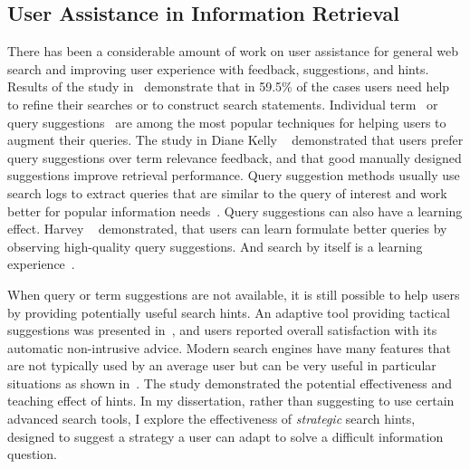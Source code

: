 \subsection{User Assistance in Information Retrieval}
\label{section:relatedwork:conversation:user-assist}

There has been a considerable amount of work on user assistance for general web search and improving user experience with feedback, suggestions, and hints.
Results of the study in~\cite{xie2009understanding} demonstrate that in 59.5\% of the cases users need help to refine their searches or to construct search statements.
Individual term~\cite{ruthven2003survey} or query suggestions~\cite{Bhatia:2011:QSA:2009916.2010023, Cao:2008:CQS:1401890.1401995,Jones:2006:GQS:1135777.1135835} are among the most popular techniques for helping users to augment their queries.
The study in Diane Kelly \etal~\cite{Kelly:2009:CQT:1571941.1572006} demonstrated that users prefer query suggestions over term relevance feedback, and that good manually designed suggestions improve retrieval performance.
Query suggestion methods usually use search logs to extract queries that are similar to the query of interest and work better for popular information needs~\cite{Bhatia:2011:QSA:2009916.2010023}.
Query suggestions can also have a learning effect.
Harvey \etal~\cite{Harvey:2015:LET:2766462.2767731} demonstrated, that users can learn formulate better queries by observing high-quality query suggestions.
And search by itself is a learning experience~\cite{vakkari2016searching}.

When query or term suggestions are not available, it is still possible to help users by providing potentially useful search hints.
An adaptive tool providing tactical suggestions was presented in~\cite{Kriewel2010}, and users reported overall satisfaction with its automatic non-intrusive advice.
Modern search engines have many features that are not typically used by an average user but can be very useful in particular situations as shown in~\cite{Moraveji:2011:MIU:2009916.2009966}.
The study demonstrated the potential effectiveness and teaching effect of hints.
In my dissertation, rather than suggesting to use certain advanced search tools, I explore the effectiveness of \textit{strategic} search hints, designed to suggest a strategy a user can adapt to solve a difficult information question.


